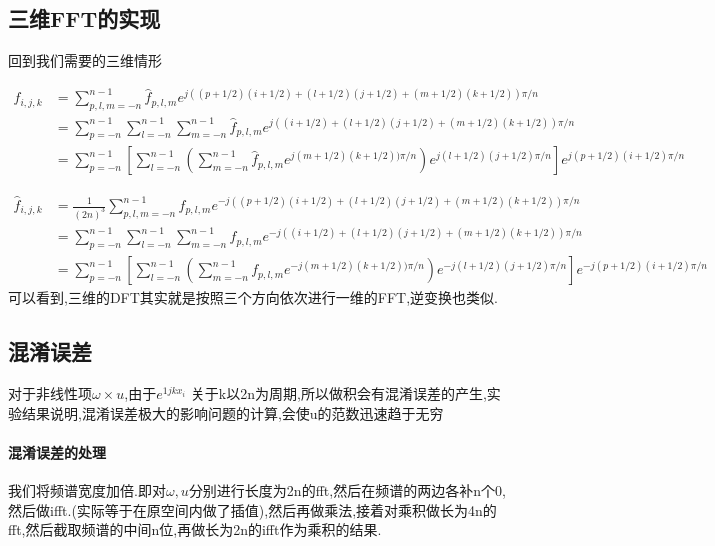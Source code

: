\documentclass[UTF8]{ctexart}
\begin{document}
\subsection{三维FFT的实现}
回到我们需要的三维情形

\begin{equation}
 \begin{split}
f_{i,j,k} & = \sum\limits_{p,l,m=-n}^{n-1}\hat{f}_{p,l,m} e^{j((p+1/2)(i+1/2)+(l+1/2)(j+1/2)+(m+1/2)(k+1/2))\pi/n} \\
 &= \sum\limits_{p=-n}^{n-1} \sum\limits_{l=-n}^{n-1} \sum\limits_{m=-n}^{n-1}\hat{f}_{p,l,m} e^{j((i+1/2)+(l+1/2)(j+1/2)+(m+1/2)(k+1/2))\pi/n} \\
 &= \sum\limits_{p=-n}^{n-1} \left[\sum\limits_{l=-n}^{n-1} \left(\sum\limits_{m=-n}^{n-1}\hat{f}_{p,l,m} e^{j(m+1/2)(k+1/2))\pi/n}\right) e^{j(l+1/2)(j+1/2)\pi/n} \right] e^{j(p+1/2)(i+1/2)\pi/n}
 \end{split}
\end{equation}

\begin{equation}
 \begin{split}
\hat{f}_{i,j,k} & = \frac{1}{(2n)^3}\sum\limits_{p,l,m=-n}^{n-1}f_{p,l,m} e^{-j((p+1/2)(i+1/2)+(l+1/2)(j+1/2)+(m+1/2)(k+1/2))\pi/n} \\
 &= \sum\limits_{p=-n}^{n-1} \sum\limits_{l=-n}^{n-1} \sum\limits_{m=-n}^{n-1}f_{p,l,m} e^{-j((i+1/2)+(l+1/2)(j+1/2)+(m+1/2)(k+1/2))\pi/n} \\
 &= \sum\limits_{p=-n}^{n-1} \left[\sum\limits_{l=-n}^{n-1} \left(\sum\limits_{m=-n}^{n-1}f_{p,l,m} e^{-j(m+1/2)(k+1/2))\pi/n}\right) e^{-j(l+1/2)(j+1/2)\pi/n} \right] e^{-j(p+1/2)(i+1/2)\pi/n}
 \end{split}
\end{equation}
可以看到,三维的DFT其实就是按照三个方向依次进行一维的FFT,逆变换也类似.

\subsection{混淆误差}
对于非线性项$\omega \times u$,由于$e^{1jkx_i}$ 关于k以2n为周期,所以做积会有混淆误差的产生,实验结果说明,混淆误差极大的影响问题的计算,会使u的范数迅速趋于无穷

\paragraph{混淆误差的处理}
我们将频谱宽度加倍.即对$\omega,u$分别进行长度为2n的fft,然后在频谱的两边各补n个0,然后做ifft.(实际等于在原空间内做了插值),然后再做乘法,接着对乘积做长为4n的fft,然后截取频谱的中间n位,再做长为2n的ifft作为乘积的结果.
\end{document}
